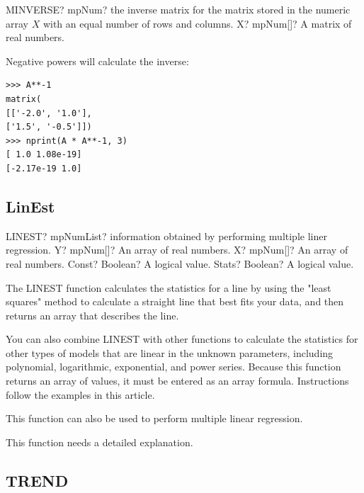 \begin{mpFunctionsExtract}
	\mpWorksheetFunctionOneNotImplemented
	{MINVERSE? mpNum? the  inverse matrix for the matrix stored in the numeric array  $X$ with an equal number of rows and columns.}
	{X? mpNum[]? A matrix of real numbers.}
\end{mpFunctionsExtract}


Negative powers will calculate the inverse:

\begin{lstlisting}
>>> A**-1
matrix(
[['-2.0', '1.0'],
['1.5', '-0.5']])
>>> nprint(A * A**-1, 3)
[ 1.0 1.08e-19]
[-2.17e-19 1.0]
\end{lstlisting}






\subsection{LinEst}
\label{LinEst}

\begin{mpFunctionsExtract}
	\mpWorksheetFunctionFourNotImplemented
	{LINEST? mpNumList? information obtained by performing multiple liner regression.}
	{Y? mpNum[]? An array of real numbers.}
	{X? mpNum[]? An array of real numbers.}
	{Const? Boolean? A logical value.}
	{Stats? Boolean? A logical value.}
\end{mpFunctionsExtract}



\vspace{0.3cm}
The LINEST function calculates the statistics for a line by using the "least squares" method to calculate a straight line that best fits your data, and then returns an array that describes the line. 

You can also combine LINEST with other functions to calculate the statistics for other types of models that are linear in the unknown parameters, including polynomial, logarithmic, exponential, and power series. Because this function returns an array of values, it must be entered as an array formula. Instructions follow the examples in this article.

This function can also be used to perform multiple linear regression.

This function needs a detailed explanation.



\subsection{TREND}

